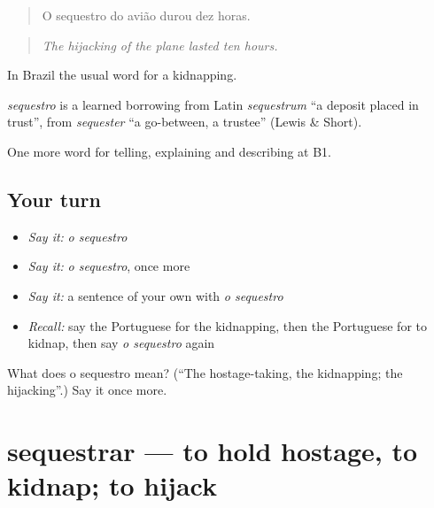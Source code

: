 \begin{quote}
O sequestro do avião durou dez horas.
\end{quote}

\begin{quote}
\emph{The hijacking of the plane lasted ten hours.}
\end{quote}

In Brazil the usual word for a kidnapping.

\begin{cousinweb}
\emph{sequestro} is a learned borrowing from Latin \emph{sequestrum} \textquotedblleft{}a deposit placed in trust\textquotedblright{}, from \emph{sequester} \textquotedblleft{}a go-between, a trustee\textquotedblright{} (Lewis \& Short).
\end{cousinweb}

\begin{grammarlens}[title={What you've built}]
One more word for telling, explaining and describing at B1.
\end{grammarlens}

\subsection*{Your turn}
\begin{itemize}
\raggedright
  \item \emph{Say it:} \emph{o sequestro}
  \item \emph{Say it:} \emph{o sequestro}, once more
  \item \emph{Say it:} a sentence of your own with \emph{o sequestro}
  \item \emph{Recall:} say the Portuguese for the kidnapping, then the Portuguese for to kidnap, then say \emph{o sequestro} again
\end{itemize}

\begin{tcolorbox}[breakable,colback=teal!4,colframe=teal!35!black,title={Before you move on}]
What does o sequestro mean? (\textquotedblleft{}The hostage-taking, the kidnapping; the hijacking\textquotedblright{}.) Say it once more.
\end{tcolorbox}
\section[sequestrar]{sequestrar — to hold hostage, to kidnap; to hijack}

\label{lesson:PT-C291-sequestrar}



